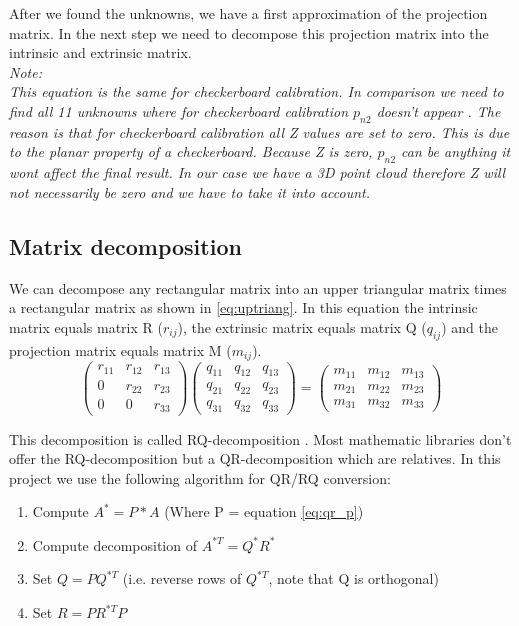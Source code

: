 \documentclass[11pt,a4paper,titlepage,oneside]{report}
\begin{document}
After we found the unknowns, we have a first approximation of the projection matrix. In the next step we need to decompose this projection matrix into the intrinsic and extrinsic matrix.\\
\em
Note:\\
This equation is the same for checkerboard calibration. In comparison we need to find all 11 unknowns where for checkerboard calibration $p_{n2}$ doesn't appear \cite{Zhang}. The reason is that for checkerboard calibration all Z values are set to zero. This is due to the planar property of a checkerboard. Because Z is zero, $p_{n2}$ can be anything it wont affect the final result. In our case we have a 3D point cloud therefore Z will not necessarily be zero and we have to take it into account.
\normalfont

\subsection{Matrix decomposition}\label{sec:matrix_dec}
We can decompose any rectangular matrix into an upper triangular matrix times a rectangular matrix as shown in \ref{eq:uptriang}. In this equation the intrinsic matrix equals matrix R ($r_{ij}$), the extrinsic matrix equals matrix Q ($q_{ij}$) and the projection matrix equals matrix M ($m_{ij}$).
\begin{equation}\label{eq:uptriang}
	\begin{pmatrix}
		r_{11} & r_{12} & r_{13}\\
		0 & r_{22} & r_{23}\\
		0 & 0 & r_{33}
	\end{pmatrix}
	\begin{pmatrix}
		q_{11} & q_{12} & q_{13}\\
		q_{21} & q_{22} & q_{23}\\
		q_{31} & q_{32} & q_{33}
	\end{pmatrix}=
	\begin{pmatrix}
		m_{11} & m_{12} & m_{13}\\
		m_{21} & m_{22} & m_{23}\\
		m_{31} & m_{32} & m_{33}
	\end{pmatrix}
\end{equation}

This decomposition is called RQ-decomposition \cite{qr_decomposition}. Most mathematic libraries don't offer the RQ-decomposition but a QR-decomposition which are relatives. In this project we use the following algorithm \cite{rq_stack} for QR/RQ conversion:
\begin{enumerate}
	\item Compute $A^{*}=P*A$ (Where P = equation \ref{eq:qr_p})
	\item Compute decomposition of $A^{*T}=Q^*R^*$
	\item Set $Q=PQ^{*T}$ (i.e. reverse rows of $Q^{*T}$, note that Q is orthogonal)
	\item Set $R=PR^{*T}P$
\end{enumerate}
\end{document}
